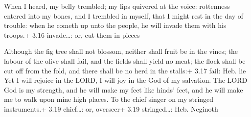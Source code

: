  When I heard, my belly trembled; my lips quivered at the
voice: rottenness entered into my bones, and I trembled in myself, that
I might rest in the day of trouble: when he cometh up unto the people,
he will invade them with his troops.+ 3.16 invade\ldots: or, cut them in
pieces

 Although the fig tree shall not blossom, neither shall
fruit be in the vines; the labour of the olive shall fail, and the
fields shall yield no meat; the flock shall be cut off from the fold,
and there shall be no herd in the stalls:+ 3.17 fail: Heb. lie
 Yet I will rejoice in the LORD, I will joy in the God of
my salvation.  The LORD God is my strength, and he will
make my feet like hinds' feet, and he will make me to walk upon mine
high places. To the chief singer on my stringed instruments.+ 3.19
chief\ldots: or, overseer+ 3.19 stringed\ldots: Heb. Neginoth
